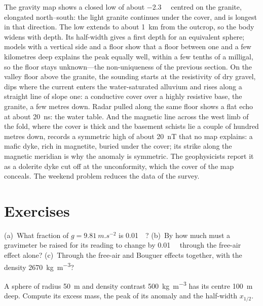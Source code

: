 \begin{example}\label{ex:b3:field-lab-methods-3:varden}
The gravity map shows a closed low of about \qty{-2.3}{\milli\gal}
centred on the granite, elongated north--south: the light granite
continues under the cover, and is longest in that direction. The low
extends to about \qty{1}{km} from the outcrop, so the body widens with
depth. Its half-width gives a first depth for an equivalent sphere;
models with a vertical side and a floor show that a floor between one
and a few kilometres deep explains the peak equally well, within a few
tenths of a milligal, so the floor stays unknown---the non-uniqueness of
the previous section. On the valley floor above the granite, the
sounding starts at the resistivity of dry gravel, dips where the
current enters the water-saturated alluvium and rises along a straight
line of slope one: a conductive cover over a highly resistive base, the
granite, a few metres down. Radar pulled along the same floor shows a
flat echo at about \qty{20}{ns}: the water table. And the magnetic line
across the west limb of the fold, where the cover is thick and the
basement schists lie a couple of hundred metres down, records a
symmetric high of about \qty{20}{nT} that no map explains: a mafic dyke,
rich in magnetite, buried under the cover; its strike along the
magnetic meridian is why the anomaly is symmetric. The geophysicists
report it as a dolerite dyke cut off at the unconformity, which the
cover of the map conceals. The weekend problem reduces the data of the
survey.
\end{example}

\section{Exercises}

\begin{exercise}[$\star$]\label{exo:b3:field-lab-methods-3:1}
(a)~What fraction of $g = \qty{9.81}{m.s^{-2}}$ is \qty{0.01}{\milli\gal}?
(b)~By how much must a gravimeter be raised for its reading to change
by \qty{0.01}{\milli\gal} through the free-air effect alone? (c)~Through
the free-air and Bouguer effects together, with the density
\qty{2670}{kg.m^{-3}}?
\end{exercise}

\begin{exercise}[$\star$]\label{exo:b3:field-lab-methods-3:2}
A sphere of radius \qty{50}{m} and density contrast
\qty{+500}{kg.m^{-3}} has its centre \qty{100}{m} deep. Compute its
excess mass, the peak of its anomaly and the half-width $x_{1/2}$.
\end{exercise}

